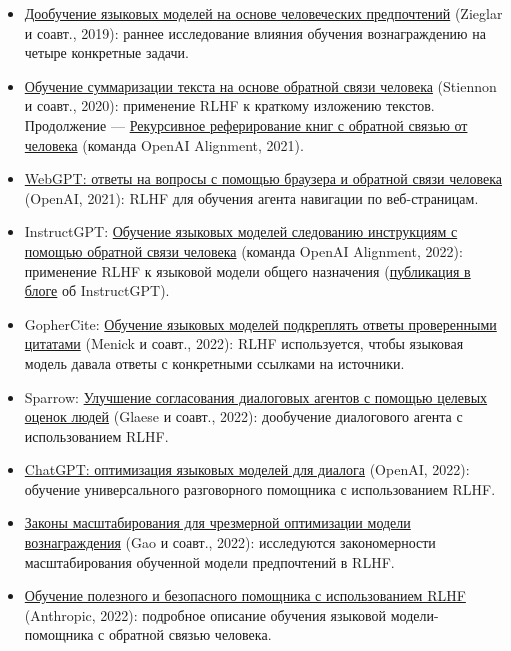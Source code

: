 \documentclass[11pt,a4paper]{article}
\begin{document}
\begin{itemize}
\item
  \href{https://arxiv.org/abs/1909.08593}{Дообучение языковых моделей на основе человеческих предпочтений} (Zieglar и соавт., 2019): раннее исследование влияния обучения вознаграждению на четыре конкретные задачи.
\item
  \href{https://proceedings.neurips.cc/paper/2020/hash/1f89885d556929e98d3ef9b86448f951-Abstract.html}{Обучение суммаризации текста на основе обратной связи человека} (Stiennon и соавт., 2020): применение RLHF к краткому изложению текстов. Продолжение --- \href{https://arxiv.org/abs/2109.10862}{Рекурсивное реферирование книг с обратной связью от человека} (команда OpenAI Alignment, 2021).
\item
  \href{https://arxiv.org/abs/2112.09332}{WebGPT: ответы на вопросы с помощью браузера и обратной связи человека} (OpenAI, 2021): RLHF для обучения агента навигации по веб-страницам.
\item
  InstructGPT: \href{https://arxiv.org/abs/2203.02155}{Обучение языковых моделей следованию инструкциям с помощью обратной связи человека} (команда OpenAI Alignment, 2022): применение RLHF к языковой модели общего назначения (\href{https://openai.com/blog/instruction-following/}{публикация в блоге} об InstructGPT).
\item
  GopherCite: \href{https://www.deepmind.com/publications/gophercite-teaching-language-models-to-support-answers-with-verified-quotes}{Обучение языковых моделей подкреплять ответы проверенными цитатами} (Menick и соавт., 2022): RLHF используется, чтобы языковая модель давала ответы с конкретными ссылками на источники.
\item
  Sparrow: \href{https://arxiv.org/abs/2209.14375}{Улучшение согласования диалоговых агентов с помощью целевых оценок людей} (Glaese и соавт., 2022): дообучение диалогового агента с использованием RLHF.
\item
  \href{https://openai.com/blog/chatgpt/}{ChatGPT: оптимизация языковых моделей для диалога} (OpenAI, 2022): обучение универсального разговорного помощника с использованием RLHF.
\item
  \href{https://arxiv.org/abs/2210.10760}{Законы масштабирования для чрезмерной оптимизации модели вознаграждения} (Gao и соавт., 2022): исследуются закономерности масштабирования обученной модели предпочтений в RLHF.
\item
  \href{https://arxiv.org/abs/2204.05862}{Обучение полезного и безопасного помощника с использованием RLHF} (Anthropic, 2022): подробное описание обучения языковой модели-помощника с обратной связью человека.

\end{itemize}
\end{document}
